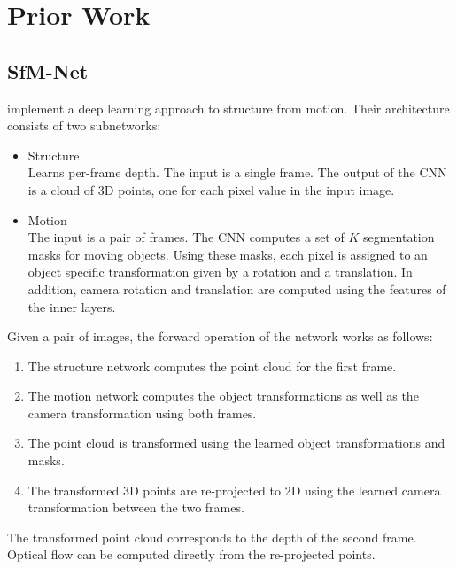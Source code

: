 \chapter{Prior Work}

    \section{SfM-Net}
    
        \citet{SFMNET} implement a deep learning approach to structure from motion. 
        Their architecture consists of two subnetworks:
        \begin{itemize}
            \item Structure 
                \\
                Learns per-frame depth.
                The input is a single frame. 
                The output of the CNN is a cloud of 3D points, one for each pixel value in the input image.
            \item Motion
                \\
                The input is a pair of frames.
                The CNN computes a set of $K$ segmentation masks for moving objects. 
                Using these masks, each pixel is assigned to an object specific transformation given by a rotation and a translation.
                In addition, camera rotation and translation are computed using the features of the inner layers.
        \end{itemize}
        Given a pair of images, the forward operation of the network works as follows:
        \begin{enumerate}
            \item The structure network computes the point cloud for the first frame.
            \item The motion network computes the object transformations as well as the camera transformation using both frames.
            \item The point cloud is transformed using the learned object transformations and masks.
            \item The transformed 3D points are re-projected to 2D using the learned camera transformation between the two frames.
        \end{enumerate}
        The transformed point cloud corresponds to the depth of the second frame.
        Optical flow can be computed directly from the re-projected points.
        
